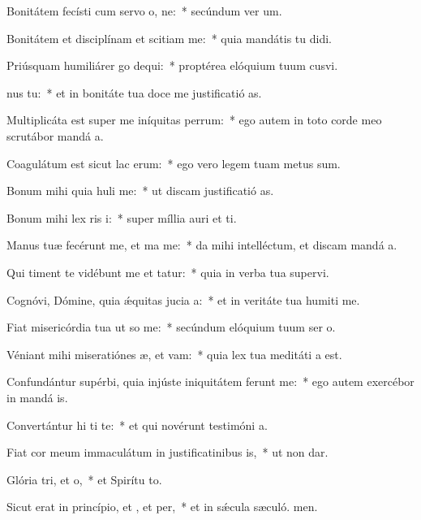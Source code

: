 \item Bonitátem fecísti cum servo o, ne:~* secúndum ver um.
\item Bonitátem et disciplínam et scitiam  me:~* quia mandátis tu didi.
\item Priúsquam humiliárer go dequi:~* proptérea elóquium tuum cusvi.
\item {}nus  tu:~* et in bonitáte tua doce me justificatió as.
\item Multiplicáta est super me iníquitas perrum:~* ego autem in toto corde meo scrutábor mandá a.
\item Coagulátum est sicut lac  erum:~* ego vero legem tuam metus sum.
\item Bonum mihi quia huli me:~* ut discam justificatió as.
\item Bonum mihi lex ris i:~* super míllia auri et ti.
\item Manus tuæ fecérunt me, et ma me:~* da mihi intelléctum, et discam mandá a.
\item Qui timent te vidébunt me et tatur:~* quia in verba tua supervi.
\item Cognóvi, Dómine, quia ǽquitas jucia a:~* et in veritáte tua humiti me.
\item Fiat misericórdia tua ut so me:~* secúndum elóquium tuum ser o.
\item Véniant mihi miseratiónes æ, et vam:~* quia lex tua meditáti a est.
\item Confundántur supérbi, quia injúste iniquitátem ferunt  me:~* ego autem exercébor in mandá is.
\item Convertántur hi ti te:~* et qui novérunt testimóni a.
\item Fiat cor meum immaculátum in justificatinibus is,~* ut non dar.
\item Glória tri, et o,~* et Spirítu to.
\item Sicut erat in princípio, et , et per,~* et in sǽcula sæculó. men.
